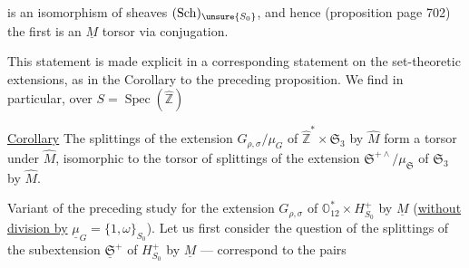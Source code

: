 

is an isomorphism of sheaves 
$(\mathrm{Sch})_{\unsure{S_0}}$, and hence (proposition page 702)
the first is an $\underline{M}$ torsor via conjugation.

This statement is made explicit in a corresponding statement on the set-theoretic
extensions, as in the Corollary to the preceding proposition.
We find in particular, over $S=\operatorname{Spec}(\widehat{\mathbb{Z}})$

\uline{Corollary} The splittings of the extension
$G_{\rho,\sigma}/\mu_G$ of
$\widehat{\mathbb{Z}}^{*}\times\mathfrak{S}_3$ by $\widehat{M}$
form a torsor under $\widehat{M}$, isomorphic
 to the torsor of splittings of the extension
$\mathfrak{S}^{+\wedge}/\mu_{\mathfrak{S}}$  of
$\mathfrak{S}_3$ by $\widehat{M}$.


Variant of the preceding study for the extension $G_{\rho,\sigma}$ of
$\mathbb O_{12}^{*}\times H_{S_0}^{+}$ by
$\underline{M}$ (\uline{without division by}
$\underline{\mu}_G=\{1,\omega\}_{S_0}$). Let us first consider the question of the
splittings of the subextension $\underline{\mathfrak{S}}^{+}$ of
$H_{S_0}^{+}$ by $\underline{M}$ --- 
correspond to the pairs

